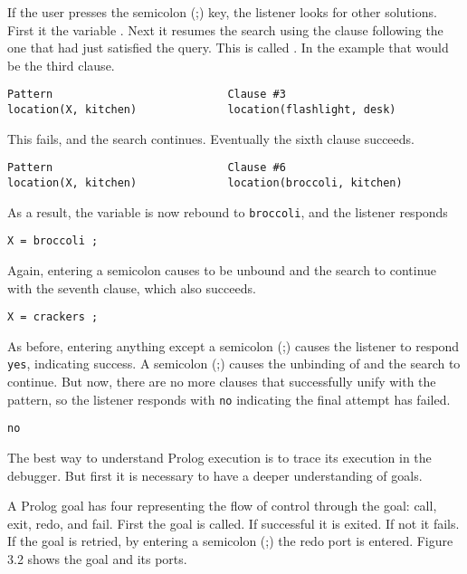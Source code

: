 If the user presses the semicolon (;) key, the listener looks for other
solutions. First it  the variable . Next it resumes the
search using the clause following the one that had just satisfied the query.
This is called . In the example that
would be the third clause.
\begin{verbatim}
Pattern                           Clause #3 
location(X, kitchen)              location(flashlight, desk) 
\end{verbatim}

This fails, and the search continues. Eventually the sixth clause succeeds.
\begin{verbatim}
Pattern                           Clause #6 
location(X, kitchen)              location(broccoli, kitchen) 
\end{verbatim}

As a result, the variable  is now rebound to \verb'broccoli', and the
listener responds
\begin{verbatim}
X = broccoli ;
\end{verbatim}

Again, entering a semicolon \keys{;} causes  to be unbound and the search
to continue with the seventh clause, which also succeeds.
\begin{verbatim}
X = crackers ;
\end{verbatim}

As before, entering anything except a semicolon (;) causes the listener to
respond \verb'yes', indicating success. A semicolon (;) causes the unbinding of
 and the search to continue. But now, there are no more clauses that
successfully unify with the pattern, so the listener responds with \verb'no'
indicating the final attempt has failed.
\begin{verbatim}
no 
\end{verbatim}
The best way to understand Prolog execution is to trace its execution in the
debugger. But first it is necessary to have a deeper understanding of goals.

A Prolog goal has four  representing the flow of
control through the goal: call, exit, redo, and fail. First the goal is called.
If successful it is exited. If not it fails. If the goal is retried, by entering
a semicolon (;) the redo port is entered. Figure 3.2 shows the goal and its
ports.


